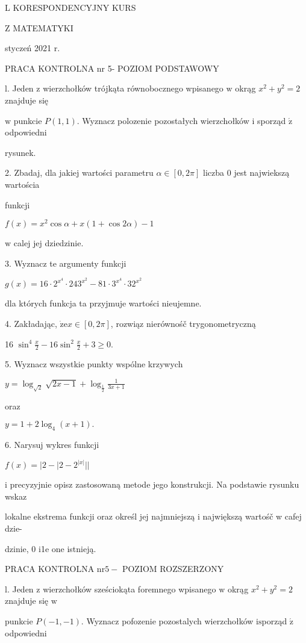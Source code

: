 \documentclass[a4paper,12pt]{article}
\begin{document}
L KORESPONDENCYJNY KURS

Z MATEMATYKI

styczeń 2021 r.

PRACA KONTROLNA nr 5- POZIOM PODSTAWOWY

l. Jeden $\mathrm{z}$ wierzchołków trójkąta równobocznego wpisanego $\mathrm{w}$ okrąg $x^{2}+y^{2}=2$ znajduje się

$\mathrm{w}$ punkcie $P(1,1)$. Wyznacz polozenie pozostałych wierzchołków $\mathrm{i}$ sporząd $\acute{\mathrm{z}}$ odpowiedni

rysunek.

2. Zbadaj, dla jakiej wartości parametru $\alpha \in [0,2\pi]$ liczba 0 jest najwiekszą wartościa

funkcji

$f(x)=x^{2}\cos\alpha+x(1+\cos 2\alpha)-1$

$\mathrm{w}$ calej jej dziedzinie.

3. Wyznacz te argumenty funkcji

$g(x)=16\cdot 2^{x^{4}}\cdot 243^{x^{2}}-81\cdot 3^{x^{4}}\cdot 32^{x^{2}}$

dla których funkcja ta przyjmuje wartości nieujemne.

4. Zakładając, $\dot{\mathrm{z}}\mathrm{e}x\in[0,2\pi]$, rozwiąz nierównośč trygonometryczną

16 $\displaystyle \sin^{4}\frac{x}{2}-16\sin^{2}\frac{x}{2}+3\geq 0.$

5. Wyznacz wszystkie punkty wspólne krzywych

$y=\displaystyle \log_{\sqrt{2}}\sqrt{2x-1}+\log_{\frac{1}{2}}\frac{1}{3x+1}$

oraz

$y=1+2\log_{4}(x+1).$

6. Narysuj wykres funkcji

$f(x)=|2-|2-2^{|x|}||$

i precyzyjnie opisz zastosowaną metode jego konstrukcji. Na podstawie rysunku wskaz

lokalne ekstrema funkcji oraz określ jej najmniejszą i największą wartośč w cafej dzie-

dzinie, 0 i1e one istnieją.




PRACA KONTROLNA $\mathrm{n}\mathrm{r} 5-$ POZIOM ROZSZERZONY

l. Jeden $\mathrm{z}$ wierzchołków sześciokąta foremnego wpisanego $\mathrm{w}$ okrąg $x^{2}+y^{2}=2$ znajduje się $\mathrm{w}$

punkcie $P(-1,-1)$. Wyznacz pofozenie pozostalych wierzchołków $\mathrm{i}\mathrm{s}$porząd $\acute{\mathrm{z}}$ odpowiedni
\end{document}
